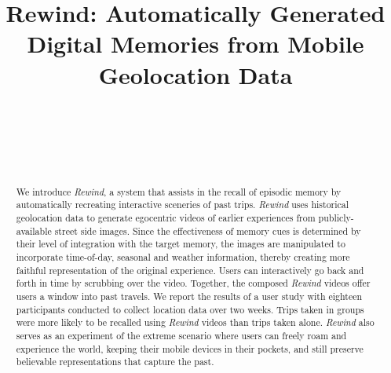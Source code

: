 \documentclass{sigchi}
\begin{document}
\title{Rewind: Automatically Generated\\Digital Memories from Mobile Geolocation Data}

\author{
  \alignauthor {~}\\
    \affaddr{~}\\
    \affaddr{~}\\
    \email{~}\\
}


\maketitle

\begin{abstract}
We introduce \textit{Rewind}, a system that assists in the recall of episodic memory by automatically recreating interactive sceneries of past trips. \textit{Rewind} uses historical geolocation data to generate egocentric videos of earlier experiences from publicly-available street side images. Since the effectiveness of memory cues is determined by their level of integration with the target memory, the images are manipulated to incorporate time-of-day, seasonal and weather information, thereby creating more faithful representation of the original experience. Users can interactively go back and forth in time by scrubbing over the video. Together, the composed \textit{Rewind} videos offer users a window into past travels. We report the results of a user study with eighteen participants conducted to collect location data over two weeks. Trips taken in groups were more likely to be recalled using \textit{Rewind} videos than trips taken alone. \textit{Rewind} also serves as an experiment of the extreme scenario where users can freely roam and experience the world, keeping their mobile devices in their pockets, and still preserve believable representations that capture the past.
\end{abstract}
\end{document}
